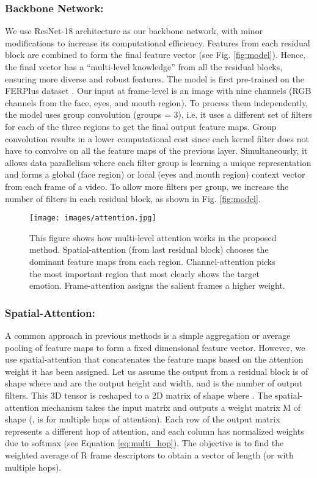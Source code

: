 \documentclass[runningheads]{llncs}
\begin{document}
\subsubsection{Backbone Network:} \label{sec: backbone}
We use ResNet-18 \cite{he2016deep} architecture as our backbone network, with minor modifications to increase its computational efficiency. Features from each residual block are combined to form the final feature vector (see Fig. \ref{fig:model}). Hence, the final vector has a “multi-level knowledge” from all the residual blocks, ensuring more diverse and robust features. The model is first pre-trained on the FERPlus dataset \cite{barsoum2016training}. Our input at frame-level is an image with nine channels (RGB channels from the face, eyes, and mouth region). To process them independently, the model uses group convolution \cite{krizhevsky2012imagenet} (groups = 3), i.e. it uses a different set of filters for each of the three regions to get the final output feature maps. Group convolution results in a lower computational cost since each kernel filter does not have to convolve on all the feature maps of the previous layer. Simultaneously, it allows data parallelism where each filter group is learning a unique representation and forms a global (face region) or local (eyes and mouth region) context vector from each frame of a video. To allow more filters per group, we increase the number of filters in each residual block, as shown in Fig. \ref{fig:model}.

\begin{figure}[t!]
\centering
\texttt{[image: images/attention.jpg]}
\caption{This figure shows how multi-level attention works in the proposed method. Spatial-attention (from last residual block) chooses the dominant feature maps from each region. Channel-attention picks the most important region that most clearly shows the target emotion. Frame-attention assigns the salient frames a higher weight.}
\label{fig:attention}
\end{figure}

\subsubsection{Spatial-Attention:} \label{sec: spatial}
A common approach in previous methods is a simple aggregation or average pooling of feature maps to form a fixed dimensional feature vector. However, we use spatial-attention \cite{lin2017structured} that concatenates the feature maps based on the attention weight it has been assigned. Let us assume the output from a residual block is of shape  where  and  are the output height and width, and  is the number of output filters. This 3D tensor  is reshaped to a 2D matrix  of shape  where . The spatial-attention mechanism takes the input matrix  and outputs a weight matrix M of shape  (,  is for multiple hops of attention). Each row of the output matrix represents a different hop of attention, and each column has normalized weights due to softmax (see Equation \ref{eq:multi_hop}). The objective is to find the weighted average of R frame descriptors to obtain a vector  of length  (or  with multiple hops). 
\end{document}

